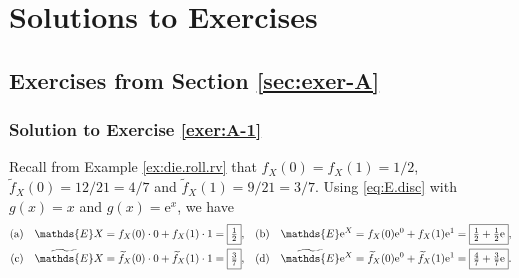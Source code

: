 \documentclass[12pt]{book}
\numberwithin{equation}{chapter}
\theoremstyle{plain}
\numberwithin{theorem}{section}
\theoremstyle{definition}
\numberwithin{exercise}{chapter}
\newcommand{\<}{\langle}
\renewcommand{\>}{\rangle}
\renewcommand{\(}{\left(}
\renewcommand{\)}{\right)}
\renewcommand{\[}{\left[}
\renewcommand{\]}{\right]}
\newcommand\Eb{\mathds{E}}
\newcommand\Ebt{\widetilde{\Eb}}
\newcommand\ft{\widetilde{f}}
\newcommand\ee{\mathrm{e}}
\theoremstyle{definition}
\numberwithin{question}{section}
\begin{document}
%
% 


%
%

\appendix

\chapter{Solutions to Exercises}


\section{Exercises from Section \ref{sec:exer-A}}

\subsection*{Solution to Exercise \ref{exer:A-1}}
Recall from Example \ref{ex:die.roll.rv} that $f_X(0) = f_X(1) = 1/2$, $\ft_X(0) = 12/21 = 4/7$ and $\ft_X(1) = 9/21 = 3/7$.  Using \eqref{eq:E.disc} with $g(x) = x$ and $g(x) = \ee^x$, we have
\begin{align}
\text{(a)} \quad \Eb X
	&=	f_X(0) \cdot 0 + f_X(1) \cdot 1
	=		\fbox{$\tfrac{1}{2}$} , &
\text{(b)} \quad \Eb \ee^X
	&=	f_X(0) \ee^0 + f_X(1) \ee^1
	=		\fbox{$\tfrac{1}{2} + \tfrac{1}{2} \ee$} , \\
\text{(c)} \quad \Ebt X
	&=	\ft_X(0) \cdot 0 + \ft_X(1) \cdot 1
	=		\fbox{$\tfrac{3}{7}$} , &
\text{(d)} \quad \Ebt \ee^X
	&=	\ft_X(0) \ee^0 + \ft_X(1) \ee^1
	=		\fbox{$\tfrac{4}{7} + \tfrac{3}{7} \ee$} .
\end{align}

\end{document}
